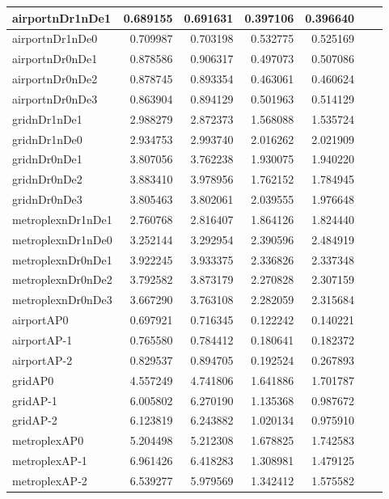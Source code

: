 \begin{longtable}{|l|r|r|r|r|r|r|}
\endlastfoot
airportnDr1nDe1 & 0.689155 & 0.691631 & 0.397106 & 0.396640 \\ \hline
airportnDr1nDe0 & 0.709987 & 0.703198 & 0.532775 & 0.525169 \\ \hline
airportnDr0nDe1 & 0.878586 & 0.906317 & 0.497073 & 0.507086 \\ \hline
airportnDr0nDe2 & 0.878745 & 0.893354 & 0.463061 & 0.460624 \\ \hline
airportnDr0nDe3 & 0.863904 & 0.894129 & 0.501963 & 0.514129 \\ \hline
gridnDr1nDe1 & 2.988279 & 2.872373 & 1.568088 & 1.535724 \\ \hline
gridnDr1nDe0 & 2.934753 & 2.993740 & 2.016262 & 2.021909 \\ \hline
gridnDr0nDe1 & 3.807056 & 3.762238 & 1.930075 & 1.940220 \\ \hline
gridnDr0nDe2 & 3.883410 & 3.978956 & 1.762152 & 1.784945 \\ \hline
gridnDr0nDe3 & 3.805463 & 3.802061 & 2.039555 & 1.976648 \\ \hline
metroplexnDr1nDe1 & 2.760768 & 2.816407 & 1.864126 & 1.824440 \\ \hline
metroplexnDr1nDe0 & 3.252144 & 3.292954 & 2.390596 & 2.484919 \\ \hline
metroplexnDr0nDe1 & 3.922245 & 3.933375 & 2.336826 & 2.337348 \\ \hline
metroplexnDr0nDe2 & 3.792582 & 3.873179 & 2.270828 & 2.307159 \\ \hline
metroplexnDr0nDe3 & 3.667290 & 3.763108 & 2.282059 & 2.315684 \\ \hline
airportAP0 & 0.697921 & 0.716345 & 0.122242 & 0.140221 \\ \hline
airportAP-1 & 0.765580 & 0.784412 & 0.180641 & 0.182372 \\ \hline
airportAP-2 & 0.829537 & 0.894705 & 0.192524 & 0.267893 \\ \hline
gridAP0 & 4.557249 & 4.741806 & 1.641886 & 1.701787 \\ \hline
gridAP-1 & 6.005802 & 6.270190 & 1.135368 & 0.987672 \\ \hline
gridAP-2 & 6.123819 & 6.243882 & 1.020134 & 0.975910 \\ \hline
metroplexAP0 & 5.204498 & 5.212308 & 1.678825 & 1.742583 \\ \hline
metroplexAP-1 & 6.961426 & 6.418283 & 1.308981 & 1.479125 \\ \hline
metroplexAP-2 & 6.539277 & 5.979569 & 1.342412 & 1.575582 \\ \hline

\end{longtable}
